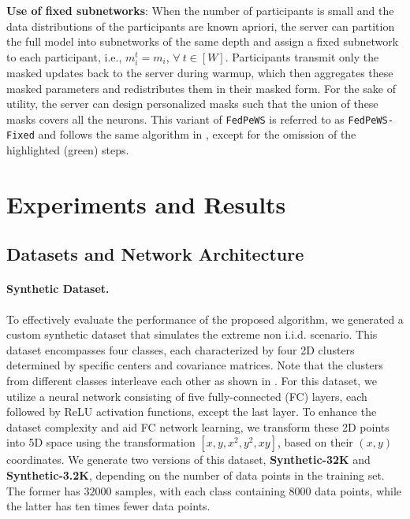 \documentclass{article}
\begin{document}
\textbf{Use of fixed subnetworks}: When the number of participants is small and the data distributions of the participants are known apriori, the server can partition the full model into subnetworks of the same depth and assign a fixed subnetwork to each participant, i.e., $m_i^t = m_i$, $\forall~ t \in [W]$. Participants transmit only the masked updates back to the server during warmup, which then aggregates these masked parameters and redistributes them in their masked form. For the sake of utility, the server can design personalized masks such that the union of these masks covers all the neurons. This variant of \texttt{FedPeWS} is referred to as \texttt{FedPeWS-Fixed} and follows the same algorithm in , except for the omission of the highlighted (green) steps. 


\section{Experiments and Results}
\label{section: exp-and-results}
\subsection{Datasets and Network Architecture} 
\label{section: datasets}

\paragraph{Synthetic Dataset.} To effectively evaluate the performance of the proposed algorithm, we generated a custom synthetic dataset that simulates the extreme non i.i.d. scenario. This dataset encompasses four classes, each characterized by four 2D clusters determined by specific centers and covariance matrices. Note that the clusters from different classes interleave each other as shown in .  For this dataset, we utilize a neural network consisting of five fully-connected (FC) layers, each followed by ReLU activation functions, except the last layer. To enhance the dataset complexity and aid FC network learning, we transform these 2D points into 5D space using the transformation $[x, y, x^2, y^2, xy]$, based on their $(x,y)$ coordinates. We generate two versions of this dataset, \textbf{Synthetic-32K} and \textbf{Synthetic-3.2K}, depending on the number of data points in the training set. The former has $32000$ samples, with each class containing $8000$ data points, while the latter has ten times fewer data points. 
\end{document}
